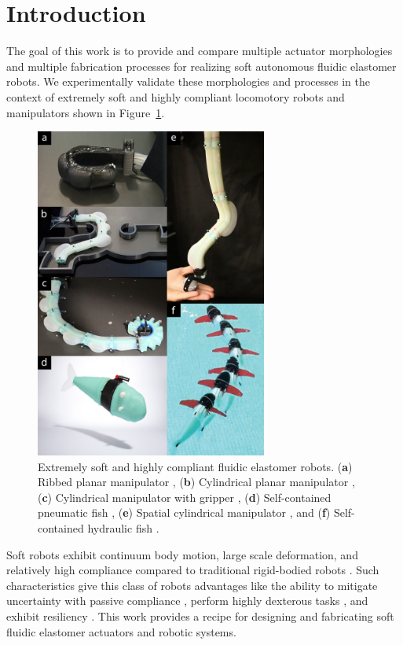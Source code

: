 
\section{Introduction}
\label{sec:Introduction}
The goal of this work is to provide and compare multiple actuator morphologies and multiple fabrication processes for realizing soft autonomous fluidic elastomer robots.
%
We experimentally validate these morphologies and processes in the context of extremely soft and highly compliant locomotory robots and manipulators shown in Figure~\ref{fig:intro_new}.
\begin{figure}[!t]
  \centering
  \includegraphics[width=3in]{figures/introduction/intronew.jpg}
  \caption{Extremely soft and highly compliant fluidic elastomer robots. (\textbf{a}) Ribbed planar manipulator \citep{marchese2014design}, (\textbf{b}) Cylindrical planar manipulator \citep{marchese2014whole}, (\textbf{c}) Cylindrical manipulator with gripper \citep{katzschmann2015autonomous}, (\textbf{d}) Self-contained pneumatic fish \citep{marchese2014autonomous}, (\textbf{e}) Spatial cylindrical manipulator \citep{marchese2015design}, and (\textbf{f}) Self-contained hydraulic fish \citep{katzschmann2014hydraulic}. }\label{fig:intro_new}
\end{figure} 

Soft robots exhibit continuum body motion, large scale deformation, and relatively high compliance compared to traditional rigid-bodied robots \citep{trivedi2008soft}.
%
Such characteristics give this class of robots advantages like the ability to mitigate uncertainty with passive compliance \citep{mcmahan2006field}, perform highly dexterous tasks \citep{deimel2014novel}, and exhibit resiliency \citep{tolley2014resilient}.
%
This work provides a recipe for designing and fabricating soft fluidic elastomer actuators and robotic systems.

